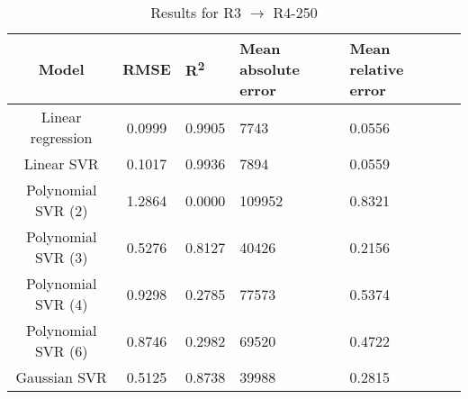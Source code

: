 \begin{table}[H]
\centering
\begin{adjustbox}{center}
\begin{tabular}{c | c M{1.2cm} M{2.5cm} M{2.5cm} M{1.8cm}}
Model & RMSE & R\textsuperscript{2} & Mean absolute error & Mean relative error \tabularnewline
\hline
Linear regression & 0.0999 & 0.9905 &   7743 & 0.0556 \\
Linear SVR & 0.1017 & 0.9936 &   7894 & 0.0559 \\
Polynomial SVR (2) & 1.2864 & 0.0000 & 109952 & 0.8321 \\
Polynomial SVR (3) & 0.5276 & 0.8127 &  40426 & 0.2156 \\
Polynomial SVR (4) & 0.9298 & 0.2785 &  77573 & 0.5374 \\
Polynomial SVR (6) & 0.8746 & 0.2982 &  69520 & 0.4722 \\
Gaussian SVR & 0.5125 & 0.8738 &  39988 & 0.2815 \\
\end{tabular}
\end{adjustbox}
\\
\caption{Results for R3 $\rightarrow$ R4-250}
\label{tab:coreonly_linear_R3_R4_250}
\end{table}
